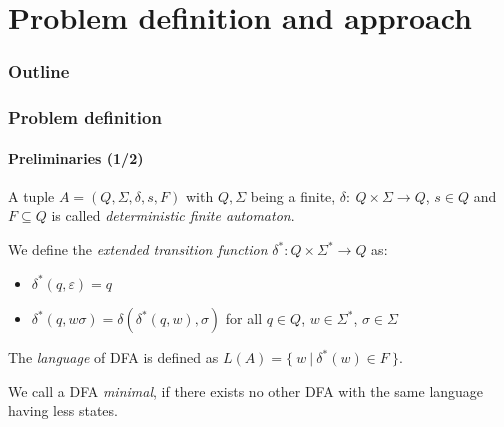 \documentclass[10pt,usenames,dvipsnames]{beamer}%
\begin{document}
	\section{Problem definition and approach}
	
	\begin{frame}
		\frametitle{Outline}
		\tableofcontents[currentsection] %
	\end{frame}
	
	\begin{frame}
		\frametitle{Problem definition}
		\framesubtitle{Preliminaries (1/2)}
		
		A tuple $A = (Q, \Sigma, \delta, s, F)$ with $Q, \Sigma$ being a finite, $\delta \colon\ Q \times \Sigma \to Q$, $s \in Q$ and $F \subseteq Q$ is called \emph{deterministic finite automaton}.
		\vspace{0.3cm}
		
		
		We define the \emph{extended transition function} $\delta^* : Q \times \Sigma^* \to Q$ as:
		\begin{itemize}
			\item $\delta^*(q,\varepsilon) = q$
			\item $\delta^*(q,w\sigma) = \delta(\delta^*(q,w),\sigma)$ for all $q \in Q$, $w \in \Sigma^*$, $\sigma \in \Sigma$
		\end{itemize}
		\vspace{0.3cm}
		
		The \emph{language} of DFA is defined as $L(A) = \{\ w\ |\ \delta^*(w) \in F\ \}$.
		\vspace{0.3cm}
		
		We call a DFA \emph{minimal}, if there exists no other DFA with the same language having less states.
	\end{frame}
		
\end{document}
